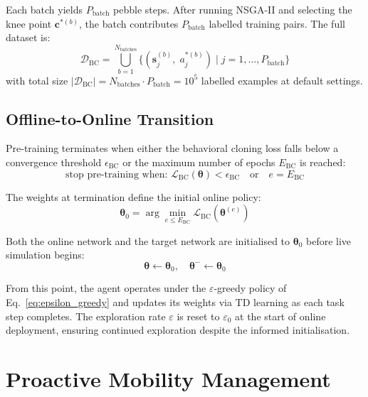 \documentclass[12pt,a4paper]{article}
\theoremstyle{definition}
\theoremstyle{remark}
\begin{document}
Each batch yields $P_{\text{batch}}$ pebble steps. After running NSGA-II and
selecting the knee point $\mathbf{c}^{*(b)}$, the batch contributes
$P_{\text{batch}}$ labelled training pairs. The full dataset is:
\begin{equation}
  \mathcal{D}_{\text{BC}} = \bigcup_{b=1}^{N_{\text{batches}}}
  \bigl\{(\mathbf{s}_j^{(b)},\; a_j^{*(b)}) \;\big|\; j=1,\ldots,P_{\text{batch}}\bigr\}
  \label{eq:full_dataset}
\end{equation}
with total size $|\mathcal{D}_{\text{BC}}| = N_{\text{batches}} \cdot P_{\text{batch}}
= 10^5$ labelled examples at default settings.

\subsection{Offline-to-Online Transition}

Pre-training terminates when either the behavioral cloning loss falls below
a convergence threshold $\epsilon_{\text{BC}}$ or the maximum number of
epochs $E_{\text{BC}}$ is reached:
\begin{equation}
  \text{stop pre-training when: }
  \mathcal{L}_{\text{BC}}(\bm{\theta}) < \epsilon_{\text{BC}}
  \quad \text{or} \quad
  e = E_{\text{BC}}
  \label{eq:bc_stop}
\end{equation}

The weights at termination define the initial online policy:
\begin{equation}
  \bm{\theta}_0 = \arg\min_{e \leq E_{\text{BC}}}
  \mathcal{L}_{\text{BC}}(\bm{\theta}^{(e)})
  \label{eq:theta_init}
\end{equation}

Both the online network and the target network are initialised to
$\bm{\theta}_0$ before live simulation begins:
\begin{equation}
  \bm{\theta} \leftarrow \bm{\theta}_0,
  \quad \bm{\theta}^{-} \leftarrow \bm{\theta}_0
  \label{eq:init_both}
\end{equation}

From this point, the agent operates under the $\varepsilon$-greedy policy
of Eq.~\eqref{eq:epsilon_greedy} and updates its weights via TD learning
as each task step completes. The exploration rate $\varepsilon$ is reset to
$\varepsilon_0$ at the start of online deployment, ensuring continued
exploration despite the informed initialisation.


\section{Proactive Mobility Management}
\label{sec:mobility}
\end{document}
